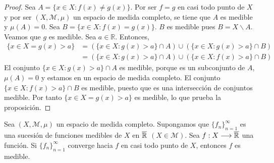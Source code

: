 \begin{proof}
Sea $A = \{ x \in X : f(x) \not = g(x)\}$. Por ser $f = g$ en casi todo punto de $X$ y por ser $(X, \mathcal{M}, \mu)$ un espacio de medida completo, se tiene que $A$ es medible y $\mu(A) = 0$. Sea $B = \{ x \in X : f(x) = g(x)\}$. $B$ es medible pues $B = X \backslash A$. Veamos que $g$ es medible. Sea $a \in \mathbb{R}$. Entonces,
\begin{align*}
    \{ x \in X = g(x) > a \} &= (\{ x \in X : g(x) > a\} \cap A) \cup (\{ x \in X : g(x) > a\} \cap B)\\
    &= (\{ x \in X : g(x) > a\} \cap A) \cup (\{ x \in X : f(x) > a\} \cap B)
\end{align*}
El conjunto $\{ x \in X : g(x) > a\} \cap A$ es medible, porque es un subconjunto de $A$, $\mu(A) = 0$ y estamos en un espacio de medida completo. El conjunto $\{ x \in X : f(x) > a\} \cap B$ es medible, puesto que es una intersección de conjuntos medible. Por tanto $\{ x \in X = g(x) > a \}$ es medible, lo que prueba la proposición.
\end{proof}

\begin{prop}
Sea $(X, \mathcal{M}, \mu)$ un espacio de medida completo. Supongamos que $\{ f_n\}_{n=1}^{\infty}$ es una sucesión de funciones medibles de $X$ en $\overline{\mathbb{R}}$ $(X \in \mathcal{M})$. Sea $f: X \longrightarrow \overline{\mathbb{R}}$ una función. Si $\{ f_n\}_{n=1}^{\infty}$ converge hacia $f$ en casi todo punto de $X$, entonces $f$ es medible. 
\end{prop}

